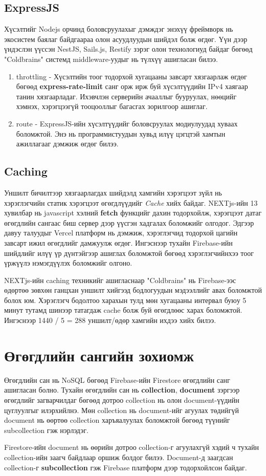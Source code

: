 \subsection{ExpressJS}
Хүсэлтийг Nodejs орчинд боловсруулахыг дэмждэг энэхүү фреймворк нь экосистем баялаг байдгаараа олон асуудлуудын шийдэл болж өгдөг. Үүн дээр үндэслэн үүссэн NestJS, Sails.js, Restify зэрэг олон технологиуд байдаг бөгөөд "Coldbrains" системд middleware-уудыг нь түлхүү ашигласан билээ. 
\begin{enumerate}
  \item throttling - Хүсэлтийн тоог тодорхой хугацааны завсарт хязгаарлаж өгдөг бөгөөд \textbf{express-rate-limit} санг орж ирж буй хүсэлтүүдийн IPv4 хаягаар танин хязгаарладаг. Ихэвчлэн серверийн ачааллыг бууруулах, нөөцийг хэмнэх, хэрэгцээгүй тооцооллыг багасгах зорилгоор ашиглаг. 
  \item route - ExpressJS-ийн хүсэлтүүдийг боловсруулах модиулуудад хуваах боломжтой. Энэ нь программистуудын хувьд илүү цэгцтэй хамтын ажиллагааг дэмжиж өгдөг билээ.
\end{enumerate}

\subsection{Caching}
Уншилт бичилтээр хязгаарлагдах шийдэлд хамгийн хэрэгцээт зүйл нь хэрэглэгчийн статик хэрэгцээт өгөгдлүүдийг \textit{Cache} хийх байдаг. NEXTjs-ийн 13 хувилбар нь javascript хэлний \textbf{fetch} функцийг дахин тодорхойлж, хэрэгцээт датаг өгөгдлийн сангаас биш сервер дээр үүсгэн хадгалах боломжийг олгодог. Эдгээр давуу талуудыг Vercel платформ нь дэмжиж, хэрэглэгчид тодорхой цагийн завсарт ижил өгөгдлийг дамжуулж өгдөг. Ингэснээр тухайн Firebase-ийн шийдлийг илүү үр дүнтэйгээр ашиглах боломжтой бөгөөд хэрэглэгчийнхээ тоог үржүүлэ нэмэгдүүлэх боломжийг олгоно. 

NEXTjs-ийн caching техникийг ашигласнаар "Coldbrains" нь Firebase-ээс өдөртөө зөвхөн ганцхан уншилт хийгээд бодлогуудын мэдээллийг авах боломжтой болох юм. Хэрэглэгч бодолтоо харахын тулд мөн хугацааны интервал буюу 5 минут тутамд шинээр татагдаж cache болж буй өгөгдлөөс харах боломжтой. Ингэснээр 1440 / 5 = 288 уншилт/өдөр хамгийн ихдээ хийх билээ.

\section{Өгөгдлийн сангийн зохиомж}
Өгөгдлийн сан нь NoSQL бөгөөд Firebase-ийн Firestore өгөгдлийн санг ашигласан болно. Тухайн өгөгдлийн сан нь \textbf{collection}, \textbf{document} зэргээр өгөгдлийг загварчилдаг бөгөөд дотроо collection нь олон document-үүдийн цуглуулгыг илэрхийлнэ. Мөн collection нь document-ийг агуулах төдийгүй document нь өөртөө collection харъяалуулах боломжтой бөгөөд түүнийг subcollection гэж нэрлэдэг. 

Firestore-ийн document нь өөрийн дотроо collection-г агуулахгүй хэдий ч тухайн collection-ийн заагч байдлаар оршиж болдог билээ. Document-д заагдсан collection-г \textbf{subcollection} гэж Firebase платформ дээр тодорхойлсон байдаг\cite{datamodeling}.

\clearpage